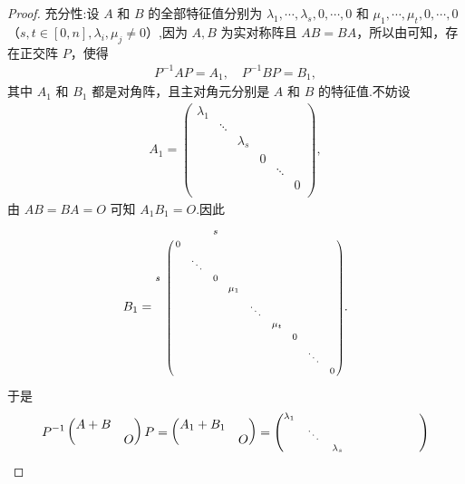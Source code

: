 \documentclass[../../main.tex]{subfiles}%
\begin{document}
\begin{proof}
{\heiti 充分性:}设 $A$ 和 $B$ 的全部特征值分别为 $\lambda _1,\cdots ,\lambda _s,0,\cdots ,0$ 和 $\mu _1,\cdots ,\mu _t,0,\cdots ,0$（$s,t\in [0,n],\lambda _i,\mu _j\ne 0$）,因为 $A,B$ 为实对称阵且 $AB=BA$，所以由可知，存在正交阵 $P$，使得
\begin{align*}
P^{-1}AP=A_1,\quad P^{-1}BP=B_1,
\end{align*}
其中 $A_1$ 和 $B_1$ 都是对角阵，且主对角元分别是 $A$ 和 $B$ 的特征值.不妨设
\begin{align*}
A_1=\begin{pmatrix}
\lambda _1&		&		&		&		&		\\
&		\ddots&		&		&		&		\\
&		&		\lambda _s&		&		&		\\
&		&		&		0&		&		\\
&		&		&		&		\ddots&		\\
&		&		&		&		&		0\\
\end{pmatrix},
\end{align*}
由 $AB=BA=O$ 可知 $A_1B_1=O$.因此
\begin{align*}
B_1=\begin{scriptsize}\bordermatrix{%
&       &		&		s&		&		&		&		&		&		\cr
&       0&		&		&		&		&		&		&		&		\cr
&       &		\ddots&		&		&		&		&		&		&		\cr
s&       &		&		0&		&		&		&		&		&		\cr
&       &		&		&		\mu _1&		&		&		&		&		\cr
&       &		&		&		&		\ddots&		&		&		&		\cr
&       &		&		&		&		&		\mu _t&		&		&		\cr
&       &		&		&		&		&		&		0&		&		\cr
&       &		&		&		&		&		&		&		\ddots&		\cr
&       &		&		&		&		&		&		&		&		0\cr
}\end{scriptsize}.
\end{align*}
于是
\begin{align*}
P^{-1}\begin{pmatrix}
A+B&		\\
&		O\\
\end{pmatrix} P=\begin{pmatrix}
A_1+B_1&		\\
&		O\\
\end{pmatrix} =\begin{scriptsize}\begin{pmatrix}
\lambda _1&		&		&		&		&		&		&		&		\\
&		\ddots&		&		&		&		&		&		&		\\
&		&		\lambda _s&		&		&		&		&		&		\\

\end{pmatrix}
\end{scriptsize}
\end{align*}
\end{proof}
\end{document}
